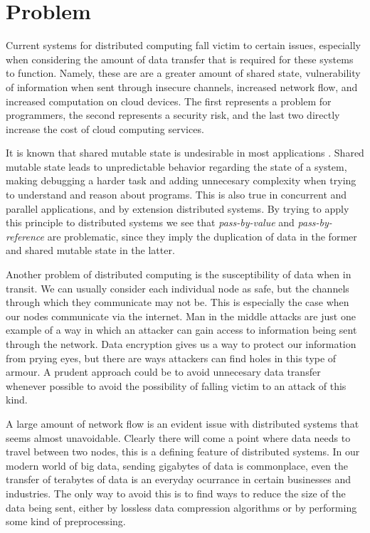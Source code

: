 
\chapter{Problem}
\label{cha:Problem}

Current systems for distributed computing fall victim to certain issues, especially when considering the amount of data transfer that is required for these systems to function. Namely, these are are a greater amount of shared state, vulnerability of information when sent through insecure channels, increased network flow, and increased computation on cloud devices. The first represents a problem for programmers, the second represents a security risk, and the last two directly increase the cost of cloud computing services.

It is known that shared mutable state is undesirable in most applications \cite{alma991003995329707681}. Shared mutable state leads to unpredictable behavior regarding the state of a system, making debugging a harder task and adding unnecesary complexity when trying to understand and reason about programs. This is also true in concurrent and parallel applications, and by extension distributed systems. By trying to apply this principle to distributed systems we see that \textit{pass-by-value} and \textit{pass-by-reference} are problematic, since they imply the duplication of data in the former and shared mutable state in the latter. 

Another problem of distributed computing is the susceptibility of data when in transit. We can usually consider each individual node as safe, but the channels through which they communicate may not be. This is especially the case when our nodes communicate via the internet. Man in the middle attacks are just one example of a way in which an attacker can gain access to information being sent through the network. Data encryption gives us a way to protect our information from prying eyes, but there are ways attackers can find holes in this type of armour. A prudent approach could be to avoid unnecesary data transfer whenever possible to avoid the possibility of falling victim to an attack of this kind.

A large amount of network flow is an evident issue with distributed systems that seems almost unavoidable. Clearly there will come a point where data needs to travel between two nodes, this is a defining feature of distributed systems. In our modern world of big data, sending gigabytes of data is commonplace, even the transfer of terabytes of data is an everyday ocurrance in certain businesses and industries. The only way to avoid this is to find ways to reduce the size of the data being sent, either by lossless data compression algorithms or by performing some kind of preprocessing. 

